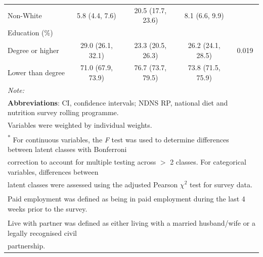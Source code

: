 \begin{table}[H]
\begin{tabular}[t]{lcccc}
	\hspace{1em}Non-White & 5.8 (4.4, 7.6) & 20.5 (17.7, 23.6) & 8.1 (6.6, 9.9) & \\
	Education (\%) &  &  &  & \\
	\hspace{1em}Degree or higher & 29.0 (26.1, 32.1) & 23.3 (20.5, 26.3) & 26.2 (24.1, 28.5) & 0.019\\
	\hspace{1em}Lower than degree & 71.0 (67.9, 73.9) & 76.7 (73.7, 79.5) & 73.8 (71.5, 75.9) & \\
	\bottomrule
	\multicolumn{5}{l}{{\scriptsize \textit{Note: }}}\\
	\multicolumn{5}{l}{{\scriptsize \textbf{Abbreviations}: CI, confidence intervals; NDNS RP, national diet and nutrition survey rolling programme.}}\\
	\multicolumn{5}{l}{{\scriptsize Variables were weighted by individual weights.}}\\
	\multicolumn{5}{l}{{\scriptsize \textsuperscript{*} For continuous variables, the \textit{F} test was used to determine differences between latent classes with Bonferroni}}\\ 
	\multicolumn{5}{l}{{\scriptsize correction to account for multiple testing across $>$ 2 classes. For categorical variables, differences between}}\\
	\multicolumn{5}{l}{{\scriptsize  latent classes were assessed using the adjusted Pearson $\chi^2$ test for survey data.}} \\
	\multicolumn{5}{l}{{\scriptsize \textsuperscript{\dag} Paid employment was defined as being in paid employment during the last 4 weeks prior to the survey.} }\\
	\multicolumn{5}{l}{{\scriptsize \textsuperscript{\ddag} Live with partner was defined as either living with a married husband/wife or a legally recognised civil}} \\
	\multicolumn{5}{l}{{\scriptsize partnership.}}\\
\end{tabular}

\end{table} 




  

